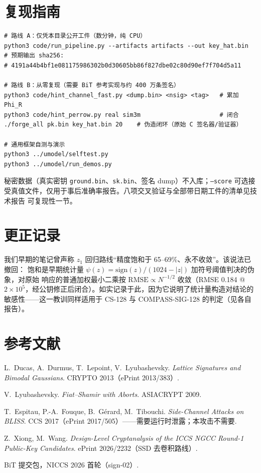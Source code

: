 \documentclass[UTF8,11pt,a4paper]{ctexart}
\newcommand{\code}[1]{\texttt{\small #1}}
\begin{document}
\section{复现指南}

\begin{verbatim}
# 路线 A：仅凭本目录公开工件（数分钟，纯 CPU）
python3 code/run_pipeline.py --artifacts artifacts --out key_hat.bin
# 预期输出 sha256:
# 4191a44b4bf1e081175986302b0d30605bb86f827dbe02c80d90ef7f704d5a11

# 路线 B：从零复现（需要 BiT 参考实现与约 400 万条签名）
python3 code/hint_channel_fast.py <dump.bin> <nsig> <tag>   # 累加 Phi_R
python3 code/hint_perrow.py real sim3m                      # 闭合
./forge_all pk.bin key_hat.bin 20    # 伪造闭环（原始 C 签名器/验证器）

# 通用框架自测与演示
python3 ../umodel/selftest.py
python3 ../umodel/run_demos.py
\end{verbatim}

秘密数据（真实密钥 \code{ground.bin}、\code{sk.bin}、签名 dump）不入库；\code{--score}
可选接受真值文件，仅用于事后准确率报告。八项交叉验证与全部带日期工件的清单见技术报告
可复现性一节。

\section{更正记录}

我们早期的笔记曾声称 $z_1$ 回归路线``精度饱和于 65--69\%、永不收敛''。该说法已撤回：
饱和是早期统计量 $\psi(z) = \mathrm{sign}(z)/(1024-|z|)$ 加符号阈值判决的伪象，对原始
响应的普通加权最小二乘按 $\mathrm{RMSE} \propto N^{-1/2}$ 收敛（RMSE 0.184 @
$2\times10^5$，经公钥修正后闭合）。如实记录于此，因为它说明了统计量构造对结论的
敏感性——这一教训同样适用于 CS-128 与 COMPASS-SIG-128 的判定（见各自报告）。

\section*{参考文献}
\begin{enumerate}[label={[\arabic*]}]
\item L.~Ducas, A.~Durmus, T.~Lepoint, V.~Lyubashevsky. \emph{Lattice Signatures and
  Bimodal Gaussians}. CRYPTO 2013（ePrint 2013/383）.
\item V.~Lyubashevsky. \emph{Fiat--Shamir with Aborts}. ASIACRYPT 2009.
\item T.~Espitau, P.-A.~Fouque, B.~G\'erard, M.~Tibouchi. \emph{Side-Channel Attacks on
  BLISS}. CCS 2017（ePrint 2017/505）——需要运行时泄露；本攻击不需要.
\item Z.~Xiong, M.~Wang. \emph{Design-Level Cryptanalysis of the ICCS NGCC Round-1
  Public-Key Candidates}. ePrint 2026/2232（SSD 去卷积路线）.
\item BiT 提交包，NICCS 2026 首轮（sign-02）.
\end{enumerate}
\end{document}
